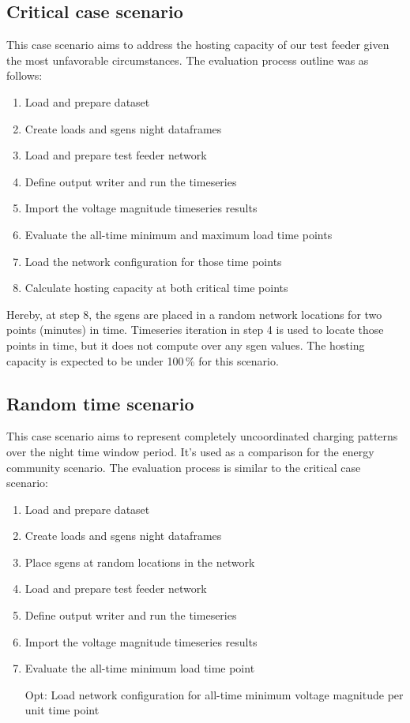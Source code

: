 \documentclass[a4paper,10pt]{report}
\begin{document}
\subsection{Critical case scenario}
This case scenario aims to address the hosting capacity of our test feeder given the most unfavorable circumstances. The evaluation process outline was as follows:
\begin{enumerate}
	\item Load and prepare dataset
	\item Create loads and sgens night dataframes
	\item Load and prepare test feeder network
	\item Define output writer and run the timeseries
	\item Import the voltage magnitude timeseries results
	\item Evaluate the all-time minimum and maximum load time points
	\item Load the network configuration for those time points
	\item Calculate hosting capacity at both critical time points
\end{enumerate}

Hereby, at step 8, the sgens are placed in a random network locations for two points (minutes) in time. Timeseries iteration in step 4 is used to locate those points in time, but it does not compute over any sgen values. The hosting capacity is expected to be under 100\,\% for this scenario.

\subsection{Random time scenario}
This case scenario aims to represent completely uncoordinated charging patterns over the night time window period. It's used as a comparison for the energy community scenario. The evaluation process is similar to the critical case scenario:
\begin{enumerate}
	\item Load and prepare dataset
	\item Create loads and sgens night dataframes
	\item Place sgens at random locations in the network
	\item Load and prepare test feeder network
	\item Define output writer and run the timeseries
	\item Import the voltage magnitude timeseries results
	\item Evaluate the all-time minimum load time point
	\item[Opt:] Load network configuration for all-time minimum voltage magnitude per unit time point
\end{enumerate}
\end{document}
